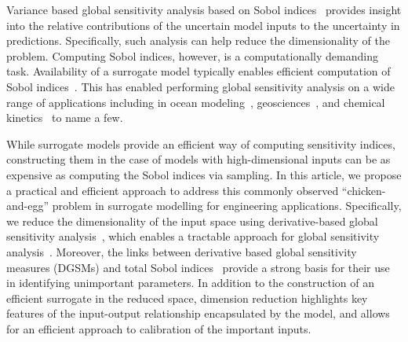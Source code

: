 
Variance based global sensitivity analysis based on Sobol indices~\cite{Sobol93,
Sobol:2001,
Owen13,
SaltelliRattoAndresEtAl08} provides
insight into the relative contributions of the uncertain model inputs to the
uncertainty in predictions. Specifically, such analysis can help reduce the
dimensionality of the problem.  Computing Sobol indices, however, is a
computationally demanding task.  
Availability of a surrogate model typically
enables efficient computation 
of Sobol indices~\cite{Sudret08,CrestauxLeMaitreMartinez09,BlatmanSudret10,HartAlexanderianGremaud17,Sargsyan17}. This has enabled performing global sensitivity analysis
on a wide range of applications including in ocean 
modeling~\cite{AlexanderianWinokurSrajEtAl12,LiIskandaraniLeHenaffEtAl16},
geosciences~\cite{Namhata2016OladyshkinDilmoreEtAl16,deman2016,SaadAlexanderianPrudhommeEtAl17},
and chemical kinetics~\cite{DegasperiGilmore08,navarro2016global,Vohra:2014}
to name a few.

While surrogate models provide an efficient way of computing sensitivity
indices, constructing them in the case of models with high-dimensional inputs
can be as expensive as computing the Sobol indices via sampling. 
In this article, we propose a practical and efficient
approach to address this commonly observed ``chicken-and-egg'' problem
in surrogate modelling for engineering applications.
Specifically, we reduce
the dimensionality of the input space using derivative-based global sensitivity
analysis~\cite{Sobol:2009,Sobol:2010,Lamboni:2013,Kucherenko:2009,Kucherenko:2016},
which enables a tractable approach for global sensitivity
analysis~\cite{Kucherenko:2016}. Moreover, the links between derivative based
global sensitivity measures (DGSMs) and total Sobol
indices~\cite{Sobol:2009,Kucherenko:2009,Kucherenko:2016} provide a strong
basis for their use in identifying unimportant parameters. In addition
to the construction of an efficient surrogate in the reduced space,
dimension reduction highlights key features of the input-output relationship
encapsulated by the model, and allows for an efficient approach to calibration
of the important inputs. 




